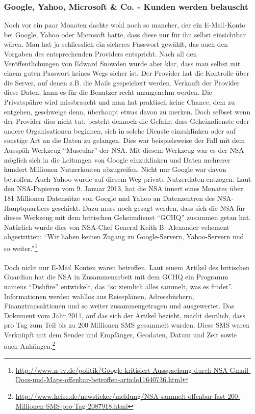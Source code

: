 \subsubsection{Google, Yahoo, Microsoft \& Co. - Kunden werden belauscht}
Noch vor ein paar Monaten dachte wohl noch so mancher, der ein E-Mail-Konto bei Google, Yahoo oder Microsoft hatte, dass diese nur für ihn selbst einsichtbar wären. Man hat ja schliesslich ein sicheres Passwort gewählt, das auch den Vorgaben des entsprechenden Providers entspricht. Nach all den Veröffentlichungen von Edward Snowden wurde aber klar, dass man selbst mit einem guten Passwort keines Wegs sicher ist. Der Provider hat die Kontrolle über die Server, auf denen z.B. die Mails gespeichert werden. Verkauft der Provider diese Daten, kann es für die Benutzer recht unangenehm werden. Die Privatspähre wird missbraucht und man hat praktisch keine Chance, dem zu entgehen, geschweige denn, überhaupt etwas davon zu merken.
Doch selbset wenn der Provider dies nicht tut, besteht dennoch die Gefahr, dass Geheimdienste oder andere Organisationen beginnen, sich in solche Dienste einzuklinken oder auf sonstige Art an die Daten zu gelangen.
Dies war beispielsweise der Fall mit dem Ausspäh-Werkzeug ``Muscular'' der NSA. Mit diesem Werkzeug war es der NSA möglich sich in die Leitungen von Google einzuklinken und Daten mehrerer hundert Millionen Nutzerkonten abzugreifen. Nicht nur Google war davon betroffen. Auch Yahoo wurde auf diesem Weg private Nutzerdaten entzogen. Laut den NSA-Papieren vom 9. Januar 2013, hat die NSA innert eines Monates über 181 Millionen Datensätze von Google und Yahoo an Datenzentren des NSA-Hauptquartiers geschickt. Dazu muss noch gesagt werden, dass sich die NSA für dieses Werkzeug mit dem britischen Geheimdienst ``GCHQ'' zusammen getan hat.
Natürlich wurde dies von NSA-Chef General Keith B. Alexander vehement abgestritten: ``Wir haben keinen Zugang zu Google-Servern, Yahoo-Servern und so weiter.''\footnote{\url{http://www.n-tv.de/politik/Google-kritisiert-Ausspaehung-durch-NSA-Gmail-Docs-und-Maps-offenbar-betroffen-article11640736.html}} 
\\
\\
Doch nicht nur E-Mail Konten waren betroffen. Laut einem Artikel des britischen Guardian hat die NSA in Zusammenarbeit mit dem GCHQ ein Programm namens ``Dishfire'' entwickelt, das ``so ziemlich alles sammelt, was es findet''.
Informationen werden wahllos aus Reiseplänen, Adressbüchern, Finanztransaktionen und so weiter zusammengetragen und ausgewertet. Das Dokument vom Jahr 2011, auf das sich der Artikel bezieht, macht deutlich, dass pro Tag zum Teil bis zu 200 Millionen SMS gesammelt wurden. Diese SMS waren Verknüpft mit dem Sender und Empfänger, Geodaten, Datum und Zeit sowie auch Anhängen.\footnote{\url{http://www.heise.de/newsticker/meldung/NSA-sammelt-offenbar-fast-200-Millionen-SMS-pro-Tag-2087918.html}}

